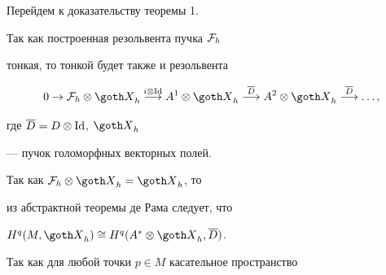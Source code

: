 




Перейдем к доказательству теоремы 1.


Так как построенная резольвента пучка ${\cal F}_h$


тонкая, то тонкой будет также и резольвента


$$


0 \to {\cal F}_{h}\otimes {\goth X}_{h}


\overset{i\otimes\Id}{\longrightarrow} A^{1}\otimes


{\goth X}_{h}


\overset{\overline D}{\longrightarrow} A^{2}\otimes {\goth


X}_{h}


\overset{\overline D}{\longrightarrow} \dotsc ,


$$


где $\overline D=D\otimes\operatorname{Id}$, ${\goth X}_{h}$


--- пучок голоморфных векторных полей.


Так как  ${\cal F}_h_{h}={\goth X}_{h}$, то


из абстрактной теоремы де Рама \cite{W} следует, что


$H^{q}(M,{\goth X}_{h})\cong H^{q}(A^{*}_{h},\overline D)$.





Так как для любой точки $p \in M$ касательное пространство


